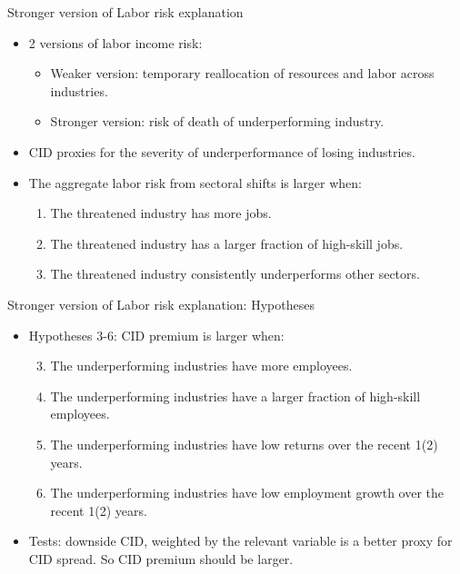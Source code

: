 \documentclass{beamer}
\begin{document}
\begin{frame}{Stronger version of Labor risk explanation}
\begin{itemize}
\item {2 versions of labor income risk:}
    \begin{itemize}
        \item {Weaker version: temporary reallocation of resources and labor across industries.}
        \item {Stronger version: risk of death of underperforming industry.}
    \end{itemize}
    \item {CID proxies for the severity of underperformance of losing industries.}
    \item {The aggregate labor risk from sectoral shifts is larger when:}
    \begin{enumerate}
        \item {The threatened industry has more jobs.}
        \item {The threatened industry has a larger fraction of high-skill jobs.}
        \item {The threatened industry consistently underperforms other sectors.}
    \end{enumerate}
\end{itemize}
\end{frame}


\begin{frame}{Stronger version of Labor risk explanation: Hypotheses}
\begin{itemize}
    \item {Hypotheses 3-6: CID premium is larger when:}
        \begin{enumerate}
        \setcounter{enumi}{2}
        \item {The underperforming industries have more employees.}
        \item {The underperforming industries have a larger fraction of high-skill employees.}
        \item {The underperforming industries have low returns over the recent 1(2) years.}
        \item {The underperforming industries have low employment growth over the recent 1(2) years.}
    \end{enumerate}
    \item {Tests: downside CID, weighted by the relevant variable is a better proxy for CID spread. So CID premium should be larger.}
\end{itemize}
\end{frame}
\end{document}
